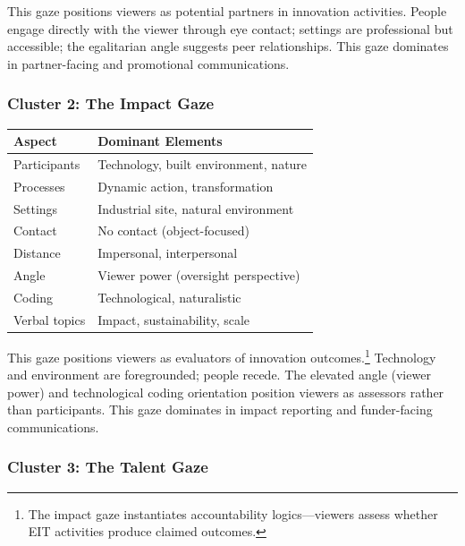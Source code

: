 \documentclass[../main.tex]{subfiles}
\begin{document}
This gaze positions viewers as potential partners in innovation activities. People engage directly with the viewer through eye contact; settings are professional but accessible; the egalitarian angle suggests peer relationships. This gaze dominates in partner-facing and promotional communications.

\subsubsection{Cluster 2: The Impact Gaze}

\begin{center}
\small
\begin{tabular}{ll}
\toprule
\textbf{Aspect} & \textbf{Dominant Elements} \\
\midrule
Participants & Technology, built environment, nature \\
Processes & Dynamic action, transformation \\
Settings & Industrial site, natural environment \\
Contact & No contact (object-focused) \\
Distance & Impersonal, interpersonal \\
Angle & Viewer power (oversight perspective) \\
Coding & Technological, naturalistic \\
Verbal topics & Impact, sustainability, scale \\
\bottomrule
\end{tabular}
\end{center}

This gaze positions viewers as evaluators of innovation outcomes.\footnote{The impact gaze instantiates accountability logics---viewers assess whether EIT activities produce claimed outcomes.} Technology and environment are foregrounded; people recede. The elevated angle (viewer power) and technological coding orientation position viewers as assessors rather than participants. This gaze dominates in impact reporting and funder-facing communications.

\subsubsection{Cluster 3: The Talent Gaze}
\end{document}
